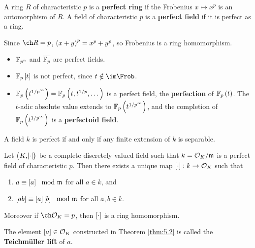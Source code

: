 \begin{definition}
A ring $ R $ of characteristic $ p $ is a \textbf{perfect ring} if the Frobenius $ x \mapsto x^p $ is an automorphism of $ R $. A field of characteristic $ p $ is a \textbf{perfect field} if it is perfect as a ring.
\end{definition}

\begin{remark*}
Since $ \ch R = p $, $ \br{x + y}^p = x^p + y^p $, so Frobenius is a ring homomorphism.
\end{remark*}

\begin{example*}
\hfill
\begin{itemize}
\item $ \mathbb{F}_{p^n} $ and $ \overline{\mathbb{F}_p} $ are perfect fields.
\item $ \FF_p\sbr{t} $ is not perfect, since $ t \notin \im \Frob $.
\item $ \FF_p\br{t^{1 / p^\infty}} = \FF_p\br{t, t^{1 / p}, \dots} $ is a perfect field, the \textbf{perfection} of $ \FF_p\br{t} $. The $ t $-adic absolute value extends to $ \FF_p\br{t^{1 / p^\infty}} $, and the completion of $ \FF_p\br{t^{1 / p^\infty}} $ is a \textbf{perfectoid field}.
\end{itemize}
\end{example*}

\begin{fact*}
A field $ k $ is perfect if and only if any finite extension of $ k $ is separable.
\end{fact*}

\pagebreak

\begin{theorem}
\label{thm:5.2}
Let $ \br{K, \abs{\cdot}} $ be a complete discretely valued field such that $ k = \mathcal{O}_K / \mathfrak{m} $ is a perfect field of characteristic $ p $. Then there exists a unique map $ \sbr{\cdot} : k \to \OOO_K $ such that
\begin{enumerate}
\item $ a \equiv \sbr{a} \mod \mmm $ for all $ a \in k $, and
\item $ \sbr{ab} \equiv \sbr{a}\sbr{b} \mod \mmm $ for all $ a, b \in k $.
\end{enumerate}
Moreover if $ \ch \OOO_K = p $, then $ \sbr{\cdot} $ is a ring homomorphism.
\end{theorem}

\begin{definition}
The element $ \sbr{a} \in \OOO_K $ constructed in Theorem \ref{thm:5.2} is called the \textbf{Teichm\"uller lift} of $ a $.
\end{definition}

